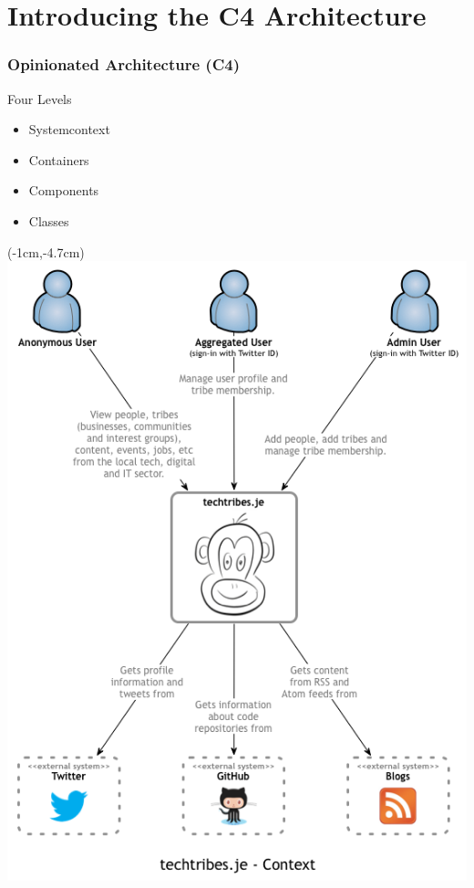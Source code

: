 \documentclass[xelatex,10pt]{beamer}
\begin{document}
\section{Introducing the C4 Architecture}
\begin{frame}
	\frametitle{Opinionated Architecture (C4)}
	Four Levels
	\begin{itemize}
		\item Systemcontext
		\item Containers
		\item Components
		\item Classes
	\end{itemize}
\end{frame}
\begin{frame}[plain]
\begin{textblock*}{0cm}(-1cm,-4.7cm)
	\includegraphics[width=1.0\paperwidth]{c4systemcontext.png}
\end{textblock*}
\end{frame}
\end{document}
